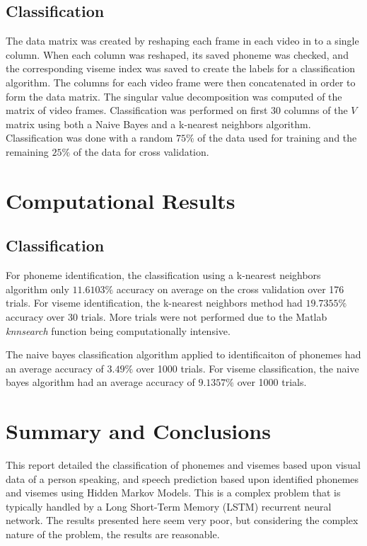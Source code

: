 \documentclass[a4paper]{article}
\begin{document}
\subsection{Classification}
The data matrix was created by reshaping each frame in each video in to a single column.  When each column was reshaped, its saved phoneme was checked, and the corresponding viseme index was saved to create the labels for a classification algorithm. The columns for each video frame were then concatenated in order to form the data matrix.  The singular value decomposition was computed of the matrix of video frames.  Classification was performed on first 30 columns of the $V$ matrix using both a Naive Bayes and a k-nearest neighbors algorithm.  Classification was done with a random $75\%$ of the data used for training and the remaining $25\%$ of the data for cross validation.

\section{Computational Results}

\subsection{Classification}
For phoneme identification, the classification using a k-nearest neighbors algorithm only $11.6103\%$ accuracy on average on the cross validation over 176 trials.  For viseme identification, the k-nearest neighbors method had $19.7355\%$ accuracy over 30 trials.  More trials were not performed due to the Matlab {\it knnsearch} function being computationally intensive.  

The naive bayes classification algorithm applied to identificaiton of phonemes had an average accuracy of $3.49\%$ over 1000 trials.  For viseme classification, the naive bayes algorithm had an average accuracy of $9.1357\%$ over 1000 trials.  

\section{Summary and Conclusions}

This report detailed the classification of phonemes and visemes based upon visual data of a person speaking, and speech prediction based upon identified phonemes and visemes using Hidden Markov Models.  This is a complex problem that is typically handled by a Long Short-Term Memory (LSTM) recurrent neural network.  The results presented here seem very poor, but considering the complex nature of the problem, the results are reasonable.  
\end{document}
